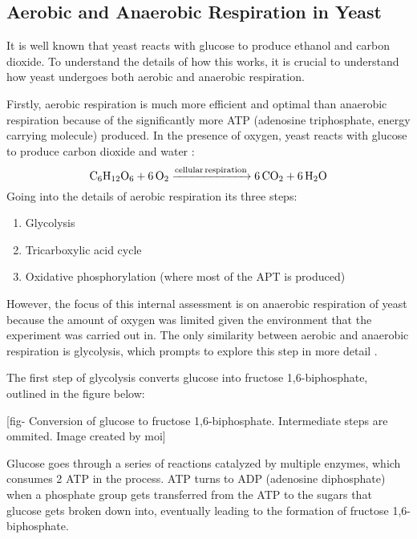 \documentclass[12pt]{article}
\begin{document}
\subsection{Aerobic and Anaerobic Respiration in Yeast}
It is well known that yeast reacts with glucose to produce ethanol and carbon dioxide. To understand the details of how this works, it is crucial to understand how yeast undergoes both aerobic and anaerobic respiration.

\medskip

Firstly, aerobic respiration is much more efficient and optimal than anaerobic respiration because of the significantly more ATP (adenosine triphosphate, energy carrying molecule) produced. In the presence of oxygen, yeast reacts with glucose to produce carbon dioxide and water \parencite{ref}:
\begin{equation}
    \ce{C6H12O6 + 6O2 ->[cellular respiration] 6CO2 + 6H2O}
\end{equation}
Going into the details of aerobic respiration its three steps:
\begin{enumerate}[topsep=0pt, noitemsep]
    \item Glycolysis
    \item Tricarboxylic acid cycle
    \item Oxidative phosphorylation (where most of the APT is produced)
\end{enumerate}

\medskip

However, the focus of this internal assessment is on anaerobic respiration of yeast because the amount of oxygen was limited given the environment that the experiment was carried out in. The only similarity between aerobic and anaerobic respiration is glycolysis, which prompts to explore this step in more detail \parencite{ref}.

\medskip

The first step of glycolysis converts glucose into fructose 1,6-biphosphate, outlined in the figure below:

[fig- Conversion of glucose to fructose 1,6-biphosphate. Intermediate steps are ommited. Image created by moi]

Glucose goes through a series of reactions catalyzed by multiple enzymes, which consumes 2 ATP in the process. ATP turns to ADP (adenosine diphosphate) when a phosphate group gets transferred from the ATP to the sugars that glucose gets broken down into, eventually leading to the formation of fructose 1,6-biphosphate.
\end{document}
